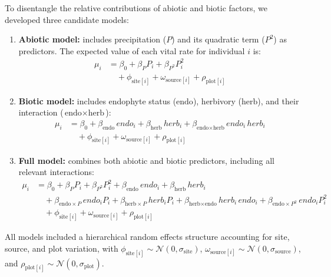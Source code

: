 \documentclass[12pt]{article}\usepackage[]{graphicx}\usepackage[dvipsnames]{xcolor}
\begin{document}
To disentangle the relative contributions of abiotic and biotic factors, we developed three candidate models:

\begin{enumerate}
    \item \textbf{Abiotic model:} includes precipitation ($P$) and its quadratic term ($P^2$) as predictors. 
    The expected value of each vital rate for individual $i$ is:
    \begin{align*}
    \mu_i &= \beta_0 + \beta_P P_i + \beta_{P^2} P_i^2 \\
    &\quad + \phi_{\text{site}[i]} + \omega_{\text{source}[i]} + \rho_{\text{plot}[i]}
    \end{align*}

    \item \textbf{Biotic model:} includes endophyte status ($\text{endo}$), herbivory ($\text{herb}$), and their interaction ($\text{endo} \times \text{herb}$):
    \begin{align*}
    \mu_i &= \beta_0 + \beta_{\text{endo}}\,endo_i + \beta_{\text{herb}}\,herb_i 
            + \beta_{\text{endo}\times \text{herb}}\,endo_i\,herb_i \\
    &\quad + \phi_{\text{site}[i]} + \omega_{\text{source}[i]} + \rho_{\text{plot}[i]}
    \end{align*}

    \item \textbf{Full model:} combines both abiotic and biotic predictors, including all relevant interactions:
    \begin{align*}
    \mu_i &= \beta_0 + \beta_P P_i + \beta_{P^2} P_i^2 + \beta_{\text{endo}}\,endo_i + \beta_{\text{herb}}\,herb_i \\
    &\quad + \beta_{\text{endo}\times P}\,endo_i P_i 
          + \beta_{\text{herb}\times P}\,herb_i P_i 
          + \beta_{\text{herb}\times \text{endo}}\,herb_i\,endo_i 
          + \beta_{\text{endo}\times P^2}\,endo_i P_i^2 \\
    &\quad + \phi_{\text{site}[i]} + \omega_{\text{source}[i]} + \rho_{\text{plot}[i]}
    \end{align*}
\end{enumerate}

All models included a hierarchical random effects structure accounting for site, source, and plot variation, with $\phi_{\text{site}[i]} \sim \mathcal{N}(0, \sigma_{\text{site}})$, $\omega_{\text{source}[i]} \sim \mathcal{N}(0, \sigma_{\text{source}})$, and $\rho_{\text{plot}[i]} \sim \mathcal{N}(0, \sigma_{\text{plot}})$.
\end{document}
